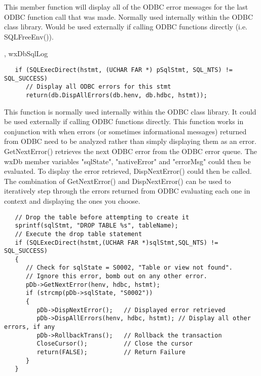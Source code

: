 
This member function will display all of the ODBC error messages for the last ODBC function call that was made.  Normally used internally within the ODBC class library.  Would be used externally if calling ODBC functions directly (i.e. SQLFreeEnv()).


, wxDbSqlLog


\begin{verbatim}
   if (SQLExecDirect(hstmt, (UCHAR FAR *) pSqlStmt, SQL_NTS) != SQL_SUCCESS)
      // Display all ODBC errors for this stmt
      return(db.DispAllErrors(db.henv, db.hdbc, hstmt));
\end{verbatim}


\label{wxdbdispnexterror}



This function is normally used internally within the ODBC class library.
It could be used externally if calling ODBC functions directly.  This
function works in conjunction with  when errors (or
sometimes informational messages)  returned from ODBC need to be analyzed
rather than simply displaying them as an error.  GetNextError() retrieves
the next ODBC error from the ODBC error queue.  The wxDb member variables
"sqlState", "nativeError" and "errorMsg" could then be evaluated.  To
display the error retrieved, DispNextError() could then be called.
The combination of GetNextError() and DispNextError() can be used to
iteratively step through the errors returned from ODBC evaluating each
one in context and displaying the ones you choose.


\begin{verbatim}
   // Drop the table before attempting to create it
   sprintf(sqlStmt, "DROP TABLE %s", tableName);
   // Execute the drop table statement
   if (SQLExecDirect(hstmt,(UCHAR FAR *)sqlStmt,SQL_NTS) != SQL_SUCCESS)
   {
      // Check for sqlState = S0002, "Table or view not found".
      // Ignore this error, bomb out on any other error.
      pDb->GetNextError(henv, hdbc, hstmt);
      if (strcmp(pDb->sqlState, "S0002"))
      {
         pDb->DispNextError();   // Displayed error retrieved
         pDb->DispAllErrors(henv, hdbc, hstmt); // Display all other errors, if any
         pDb->RollbackTrans();   // Rollback the transaction
         CloseCursor();          // Close the cursor
         return(FALSE);          // Return Failure
      }
   }
\end{verbatim}


